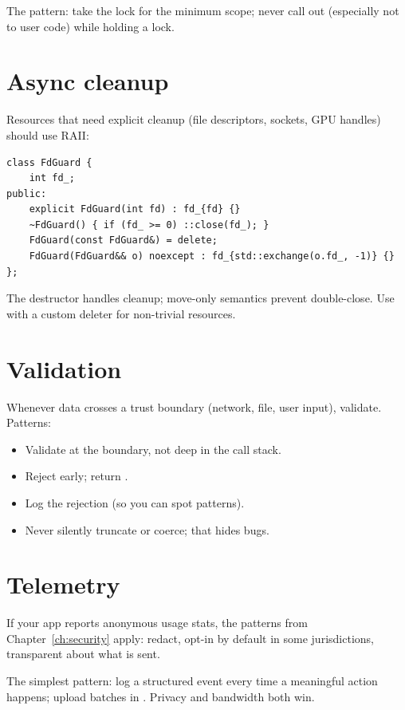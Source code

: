 The pattern: take the lock for the minimum scope; never call
out (especially not to user code) while holding a lock.

\section{Async cleanup}

Resources that need explicit cleanup (file descriptors, sockets,
GPU handles) should use RAII:

\begin{lstlisting}
class FdGuard {
    int fd_;
public:
    explicit FdGuard(int fd) : fd_{fd} {}
    ~FdGuard() { if (fd_ >= 0) ::close(fd_); }
    FdGuard(const FdGuard&) = delete;
    FdGuard(FdGuard&& o) noexcept : fd_{std::exchange(o.fd_, -1)} {}
};
\end{lstlisting}

The destructor handles cleanup; move-only semantics prevent
double-close. Use  with a custom deleter
for non-trivial resources.

\section{Validation}

Whenever data crosses a trust boundary (network, file, user
input), validate. Patterns:

\begin{itemize}[leftmargin=*]
  \item Validate at the boundary, not deep in the call stack.
  \item Reject early; return .
  \item Log the rejection (so you can spot patterns).
  \item Never silently truncate or coerce; that hides bugs.
\end{itemize}

\section{Telemetry}

If your app reports anonymous usage stats, the patterns from
Chapter~\ref{ch:security} apply: redact, opt-in by default
in some jurisdictions, transparent about what is sent.

The simplest pattern: log a structured event every time a
meaningful action happens; upload batches in
. Privacy and bandwidth both win.

